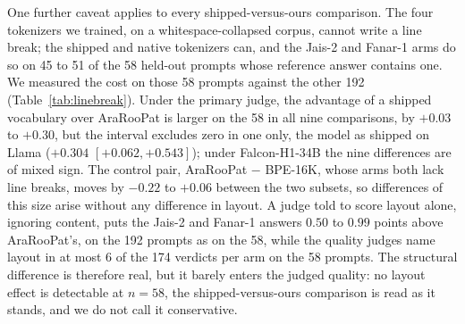 \documentclass[a4paper,fleqn]{cas-sc}
\begin{document}
One further caveat applies to every shipped-versus-ours comparison. The four tokenizers we trained, on a whitespace-collapsed corpus, cannot write a line break; the shipped and native tokenizers can, and the Jais-2 and Fanar-1 arms do so on 45 to 51 of the 58 held-out prompts whose reference answer contains one. We measured the cost on those 58 prompts against the other 192 (Table~\ref{tab:linebreak}). Under the primary judge, the advantage of a shipped vocabulary over AraRooPat is larger on the 58 in all nine comparisons, by $+0.03$ to $+0.30$, but the interval excludes zero in one only, the model as shipped on Llama ($+0.304$ $[+0.062,+0.543]$); under Falcon-H1-34B the nine differences are of mixed sign. The control pair, AraRooPat $-$ BPE-16K, whose arms both lack line breaks, moves by $-0.22$ to $+0.06$ between the two subsets, so differences of this size arise without any difference in layout. A judge told to score layout alone, ignoring content, puts the Jais-2 and Fanar-1 answers $0.50$ to $0.99$ points above AraRooPat's, on the 192 prompts as on the 58, while the quality judges name layout in at most 6 of the 174 verdicts per arm on the 58 prompts. The structural difference is therefore real, but it barely enters the judged quality: no layout effect is detectable at $n = 58$, the shipped-versus-ours comparison is read as it stands, and we do not call it conservative.
\end{document}
